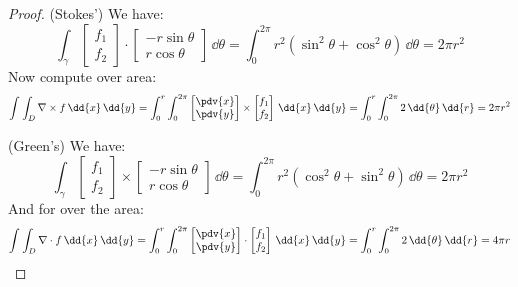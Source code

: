 \documentclass{article}
\begin{document}
    \begin{proof}
        (Stokes') We have:
            \begin{equation*}
                \int_{\gamma}^{} \begin{bmatrix}
                    f_{1} \\
                    f_{2}   
                \end{bmatrix} \cdot \begin{bmatrix}
                    -r\sin{\theta} \\
                    r\cos{\theta}
                \end{bmatrix} \, \dd{\theta}  = \int_{0}^{2\pi} r^{2}(\sin^{2}{\theta} + \cos^{2}{\theta}) \, \dd{\theta}  = 2\pi r^{2}
            \end{equation*}
        Now compute over area:
            \begin{equation*}
                \int_{}^{} \int_{D}^{} \nabla \times f \, \dd{x}  \, \dd{y} = \int_{0}^{r} \int_{0}^{2\pi} \begin{bmatrix}
                    \pdv{x} \\
                    \pdv{y}   
                \end{bmatrix} \times \begin{bmatrix}
                    f_{1} \\
                    f_{2}   
                \end{bmatrix} \, \dd{x}  \, \dd{y} = \int_{0}^{r} \int_{0}^{2\pi} 2 \, \dd{\theta}  \, \dd{r} = 2\pi r^{2}
            \end{equation*}

        (Green's) We have:
            \begin{equation*}
                \int_{\gamma}^{} \begin{bmatrix}
                    f_{1} \\
                    f_{2}   
                \end{bmatrix} \times \begin{bmatrix}
                    -r\sin{\theta} \\
                    r\cos{\theta}    
                \end{bmatrix} \, \dd{\theta}  = \int_{0}^{2\pi} r^{2}(\cos^{2}{\theta} + \sin^{2}{\theta}) \, \dd{\theta}  = 2\pi r^{2}
            \end{equation*}
        And for over the area:
            \begin{equation*}
                \int_{}^{} \int_{D}^{} \nabla \cdot f \, \dd{x}  \, \dd{y} = \int_{0}^{r} \int_{0}^{2\pi} \begin{bmatrix}
                    \pdv{x} \\
                    \pdv{y}   
                \end{bmatrix} \cdot \begin{bmatrix}
                    f_{1} \\
                    f_{2}   
                \end{bmatrix} \, \dd{x} \, \dd{y} = \int_{0}^{r} \int_{0}^{2\pi} 2 \, \dd{\theta}  \, \dd{r}  = 4\pi r
            \end{equation*}
    \end{proof}
\end{document}

